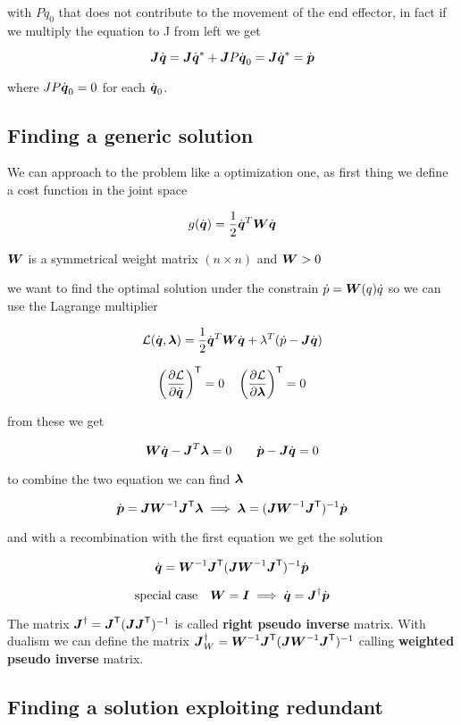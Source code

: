 with $P \dot{q}_0$ that does not contribute to the movement of the end effector, in fact if we multiply the equation to J from left we get

$$ \boldsymbol{J}\dot{\boldsymbol{q}} = \boldsymbol{J}\dot{\boldsymbol{q}}^* + \boldsymbol{J} P \dot{\boldsymbol{q}}_0 = \boldsymbol{J} \dot{\boldsymbol{q}}^* = \dot{\boldsymbol{p}} $$

where $J P \dot{\boldsymbol{q}}_0 = 0$ for each $\dot{\boldsymbol{q}}_0$.

\subsection{Finding a generic solution}

We can approach to the problem like a optimization one, as first thing we define a cost function in the joint space

$$ g(\dot{\boldsymbol{q}}) = \frac{1}{2} \dot{\boldsymbol{q}}^T \boldsymbol{W} \dot{\boldsymbol{q}} $$

$\boldsymbol{W}$ is a symmetrical weight matrix $(n \times n)$ and $\boldsymbol{W} > 0$

we want to find the optimal solution under the constrain $\dot{p} = \boldsymbol{W}(q) \dot{q}$ so we can use the Lagrange multiplier

$$ \mathcal{L}(\dot{\boldsymbol{q}}, \boldsymbol{\lambda}) = \frac{1}{2} \dot{\boldsymbol{q}}^T \boldsymbol{W} \dot{\boldsymbol{q}} + \lambda^T (\dot{p} - \boldsymbol{J} \dot{\boldsymbol{q}})$$

$$
\left(\frac{\partial \mathcal{L}}{\partial \dot{\boldsymbol{q}}}\right)^{\mathsf{T}} = 0 \quad
\left(\frac{\partial \mathcal{L}}{\partial \boldsymbol{\lambda}}\right)^{\mathsf{T}} = 0
$$

from these we get

$$ \boldsymbol{W}\dot{\boldsymbol{q}} - \boldsymbol{J}^T\boldsymbol{\lambda} = 0 \qquad \dot{\boldsymbol{p}} - \boldsymbol{J}\dot{\boldsymbol{q}} = 0 $$

to combine the two equation we can find $\boldsymbol{\lambda}$

$$
\dot{\boldsymbol{p}} = \boldsymbol{J}\boldsymbol{W}^{-1}\boldsymbol{J}^{\mathsf{T}} \boldsymbol{\lambda} \implies
\boldsymbol{\lambda} = (\boldsymbol{J}\boldsymbol{W}^{-1}\boldsymbol{J}^{\mathsf{T}})^{-1} \dot{\boldsymbol{p}}
$$

and with a recombination with the first equation we get the solution

$$ \dot{\boldsymbol{q}} = \boldsymbol{W}^{-1} \boldsymbol{J}^{\mathsf{T}} (\boldsymbol{J}\boldsymbol{W}^{-1}\boldsymbol{J}^{\mathsf{T}})^{-1} \dot{\boldsymbol{p}} $$

$$\text{special case} \quad \boldsymbol{W} = \boldsymbol{I} \implies \dot{\boldsymbol{q}} = \boldsymbol{J}^\dag \dot{\boldsymbol{p}} $$

The matrix $\boldsymbol{J}^\dag = \boldsymbol{J}^{\mathsf{T}} (\boldsymbol{J}\boldsymbol{J}^{\mathsf{T}})^{-1}$ is called \textbf{right pseudo inverse} matrix.
With dualism we can define the matrix $\boldsymbol{J}^\dag_W = \boldsymbol{W}^{-1} \boldsymbol{J}^{\mathsf{T}} (\boldsymbol{J}\boldsymbol{W}^{-1}\boldsymbol{J}^{\mathsf{T}})^{-1}$ calling \textbf{weighted pseudo inverse} matrix.

\subsection{Finding a solution exploiting redundant}

